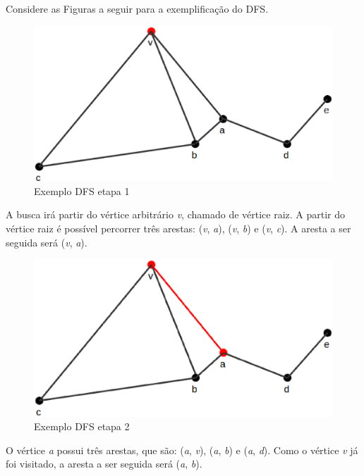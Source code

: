 \begin{apendicesenv}
Considere as Figuras a seguir para a exemplificação do DFS.

\begin{figure}[!h]
	\centering
	\includegraphics[scale=0.25]{figuras/referencial_teorico/dfs/dfs1.eps}
	\caption[Exemplo DFS etapa 1]{Exemplo DFS etapa 1 \cite{Cormen:2001}}
	\label{dfs1}
\end{figure}

A busca irá partir do vértice arbitrário \textit{v}, chamado de vértice raiz. A partir do vértice raiz é possível percorrer três arestas: (\textit{v}, \textit{a}), (\textit{v}, \textit{b}) e (\textit{v}, \textit{c}). A aresta a ser seguida será (\textit{v}, \textit{a}).

\newpage

\begin{figure}[!h]
	\centering
	\includegraphics[scale=0.25]{figuras/referencial_teorico/dfs/dfs2.eps}
	\caption[Exemplo DFS etapa 2]{Exemplo DFS etapa 2 \cite{Cormen:2001}}
	\label{dfs2}
\end{figure}

O vértice \textit{a} possui três arestas, que são: (\textit{a}, \textit{v}), (\textit{a}, \textit{b}) e (\textit{a}, \textit{d}). Como o vértice \textit{v} já foi visitado, a aresta a ser seguida será (\textit{a}, \textit{b}).


\end{apendicesenv}
